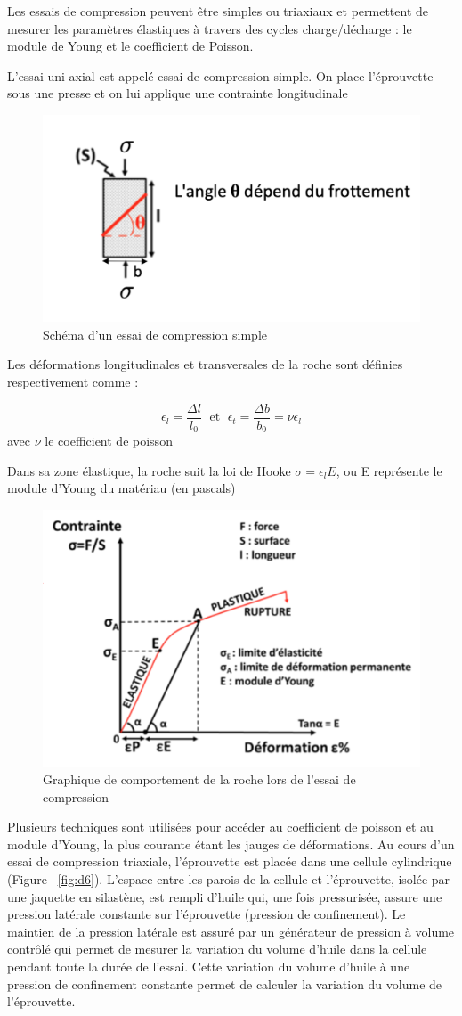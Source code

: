 \documentclass[11pt,french,a4paper]{article}
\begin{document}
Les essais de compression peuvent être simples ou triaxiaux et permettent de mesurer les paramètres élastiques à travers des cycles charge/décharge : le module de Young et le coefficient de Poisson.   

L’essai uni-axial est appelé essai de compression simple. On place l’éprouvette sous une presse et on lui applique une contrainte longitudinale %

\begin{figure}[h]
\centering
\includegraphics[width=.3\linewidth]{image/annexe/annexe_D/D4.png}
\caption{Schéma d’un essai de compression simple }
\label{fig:d4}
\end{figure}
\FloatBarrier
                         
 Les déformations longitudinales et transversales de la roche sont définies respectivement comme : 
  
$$\epsilon _l = \frac{\Delta l}{l_0} \; \textrm{  et  } \; \epsilon _t=\frac{\Delta b}{b_0}= \nu \epsilon _l $$  
 avec $\nu$ le coefficient de poisson 

Dans sa zone élastique, la roche suit la loi de Hooke $\sigma =\epsilon _l E$, ou E représente le module d’Young du matériau (en pascals)

\begin{figure}[h]
\centering
\includegraphics[width=.45\linewidth]{image/annexe/annexe_D/D5.png}
\caption{Graphique de comportement de la roche lors de l’essai de compression }
\label{fig:d5}
\end{figure}
\FloatBarrier

Plusieurs techniques sont utilisées pour accéder au coefficient de poisson et au module d’Young, la plus courante étant les jauges de déformations. 
Au cours d’un essai de compression triaxiale, l’éprouvette est placée dans une cellule cylindrique (Figure ~\ref{fig:d6}). L’espace entre les parois de la cellule et l’éprouvette, isolée par une jaquette en silastène, est rempli d’huile qui, une fois pressurisée, assure une pression latérale constante sur l’éprouvette (pression de confinement). Le maintien de la pression latérale est assuré par un générateur de pression à volume contrôlé qui permet de mesurer la variation du volume d’huile dans la cellule pendant toute la durée de l’essai. Cette variation du volume d’huile à une pression de confinement constante permet de calculer la variation du volume de l’éprouvette. 
\end{document}
